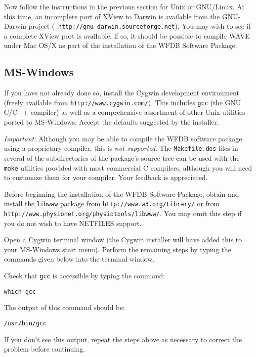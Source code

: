 \documentclass[twoside]{article}
\begin{document}
Now follow the instructions in the previous section for Unix or
GNU/Linux.  At this time, an incomplete port of XView to Darwin is
available from the GNU-Darwin project ({\tt
http://\-gnu-darwin.\-source\-forge.\-net}).  You may wish to see if a
complete XView port is available; if so, it should be possible to
compile WAVE under Mac OS/X as part of the installation of the WFDB
Software Package.

\subsection*{MS-Windows}

If you have not already done so, install the Cygwin development environment
(freely available from {\tt http://\-www.\-cygwin.\-com/}).  This includes
{\tt gcc} (the GNU C/C++ compiler) as well as a comprehensive assortment of
other Unix utilities ported to MS-Windows.  Accept the defaults suggested by
the installer.

\emph{Important:} Although you may be able to compile the WFDB software
package using a proprietary compiler, this is \emph{not supported}.  The
{\tt Makefile.dos} files in several of the subdirectories of the package's
source tree can be used with the {\tt make} utilities provided with most
commercial C compilers, although you will need to customize them for your
compiler. Your feedback is appreciated.

Before beginning the installation of the WFDB Software Package, obtain and
install the {\tt libwww} package from {\tt http://www.w3.org/Library/} or
from {\tt http://\-www.physio\-net.org/physio\-tools/libwww/}.  You may
omit this step if you do not wish to have NETFILES support.

Open a Cygwin terminal window (the Cygwin installer will have added this to
your MS-Windows start menu).  Perform the remaining steps by typing the
commands given below into the terminal window.

Check that {\tt gcc} is accessible by typing the command:

\begin{verbatim}
which gcc
\end{verbatim}

The output of this command should be:

\begin{verbatim}
/usr/bin/gcc
\end{verbatim}

If you don't see this output, repeat the steps above as necessary to correct
the problem before continuing.
\end{document}
